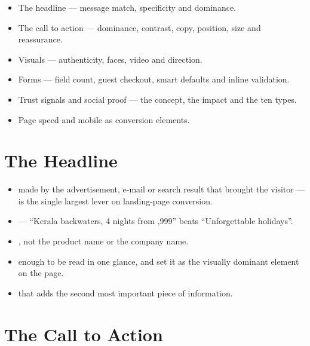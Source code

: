 \documentclass{MMTextbook}
\begin{document}
\begin{learningoutcomes}
\begin{itemize}
\item The headline --- message match, specificity and dominance.
\item The call to action --- dominance, contrast, copy, position, size and
      reassurance.
\item Visuals --- authenticity, faces, video and direction.
\item Forms --- field count, guest checkout, smart defaults and inline
      validation.
\item Trust signals and social proof --- the concept, the impact and the ten
      types.
\item Page speed and mobile as conversion elements.
\end{itemize}
\end{learningoutcomes}

\section{The Headline}

\begin{itemize}
\item {} made by the advertisement, e-mail or search result
      that brought the visitor ---  is the
      single largest lever on landing-page conversion.
\item {} --- ``Kerala backwaters, 4 nights from
      ,999'' beats ``Unforgettable holidays''.
\item {}, not the product name or the company name.
\item {} enough to be read in one glance, and set it as the
      visually dominant element on the page.
\item {} that adds the second most important
      piece of information.
\end{itemize}

\section{The Call to Action}
\end{document}
